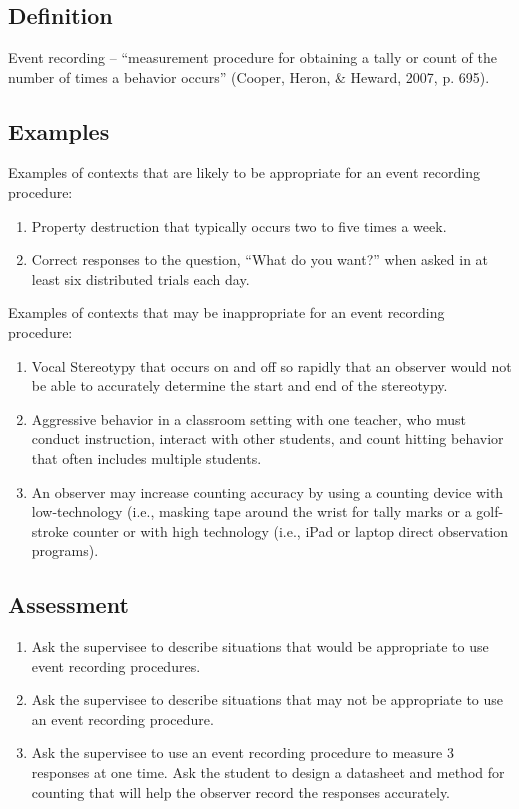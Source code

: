 \section[\fouraTwelve{}]{\fouraTwelve{}%
              }
\subsection{Definition} 
	Event recording – ``measurement procedure for obtaining a tally or count of the number of times a behavior occurs'' (Cooper, Heron, \& Heward, 2007, p. 695).
%  
\subsection{Examples}
Examples of contexts that are likely to be appropriate for an event recording procedure:
\begin{enumerate}
\item Property destruction that typically occurs two to five times a week. 
\item Correct responses to the question, ``What do you want?'' when asked in at least six distributed trials each day. 
\end{enumerate}
Examples of contexts that may be inappropriate for an event recording procedure: 
\begin{enumerate}
\item Vocal Stereotypy that occurs on and off so rapidly that an observer would not be able to accurately determine the start and end of the stereotypy.
\item Aggressive behavior in a classroom setting with one teacher, who must conduct instruction, interact with other students, and count hitting behavior that often includes multiple students.  
\item An observer may increase counting accuracy by using a counting device with low-technology (i.e., masking tape around the wrist for tally marks or a golf-stroke counter or with high technology (i.e., iPad or laptop direct observation programs). 
\end{enumerate}
%
\subsection{Assessment}
\begin{enumerate}
\item Ask the supervisee to describe situations that would be appropriate to use event recording procedures. 
\item Ask the supervisee to describe situations that may not be appropriate to use an event recording procedure.
\item Ask the supervisee to use an event recording procedure to measure 3 responses at one time. Ask the student to design a datasheet and method for counting that will help the observer record the responses accurately. 
\end{enumerate}
%
